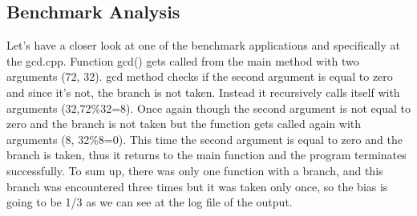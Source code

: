 \subsection{Benchmark Analysis}
Let's have a closer look at one of the benchmark applications and specifically at the gcd.cpp. Function gcd() gets called from the main method with two arguments (72, 32). gcd method checks if the second argument is equal to zero and since it's not, the branch is not taken. Instead it recursively calls itself with arguments (32,72\%32=8). Once again though the second argument is not equal to zero and the branch is not taken but the function gets called again with arguments (8, 32\%8=0). This time the second argument is equal to zero and the branch is taken, thus it returns to the main function and the program terminates successfully. To sum up, there was only one function with a branch, and this branch was encountered three times but it was taken only once, so the bias is going to be 1/3 as we can see at the log file of the output.	